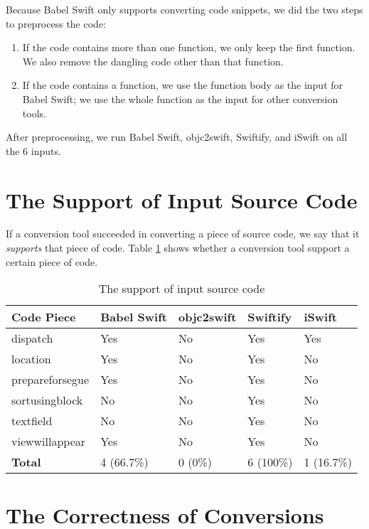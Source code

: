 \documentclass{sfuthesis}
\begin{document}
Because Babel Swift only supports converting code snippets, we did the two steps to preprocess the code:

\begin{enumerate}
  \item If the code contains more than one function, we only keep the first function. We also remove the dangling code other than that function.
  \item If the code contains a function, we use the function body as the input for Babel Swift; we use the whole function as the input for other conversion tools.
\end{enumerate}

After preprocessing, we run Babel Swift, objc2swift, Swiftify, and iSwift on all the 6 inputs.

\section{The Support of Input Source Code}

If a conversion tool succeeded in converting a piece of source code, we say that it \emph{supports} that piece of code. Table \ref{table:numcodesupported} shows whether a conversion tool support a certain piece of code.

\begin{table}[H]
\begin{center}
\caption{The support of input source code}
\begin{tabular}{|l|l|l|l|l|}
\hline
\textbf{Code Piece} & Babel Swift & objc2swift & Swiftify & iSwift \\
\hline
dispatch        & Yes & No  & Yes & Yes \\
location        & Yes & No  & Yes & No  \\
prepareforsegue & Yes & No  & Yes & No  \\
sortusingblock  & No  & No  & Yes & No  \\
textfield       & No  & No  & Yes & No  \\
viewwillappear  & Yes & No  & Yes & No  \\
\hline
\textbf{Total}  & 4 (66.7\%) & 0 (0\%) & 6 (100\%) & 1 (16.7\%) \\
\hline
\end{tabular}
\end{center}
\label{table:numcodesupported}
\end{table}

\section{The Correctness of Conversions}
\end{document}

